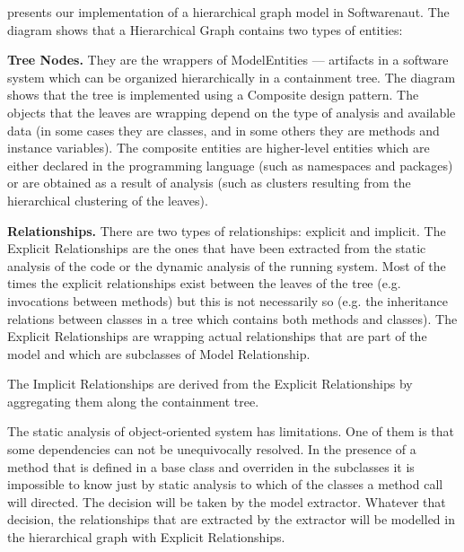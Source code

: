 \documentclass[preprint,12pt]{elsarticle}
\begin{document}
 presents our implementation of a hierarchical graph model in Softwarenaut.
The diagram shows that a Hierarchical Graph contains two types of entities: 

\begin{description}
\item {\bf Tree Nodes.} They are the wrappers of ModelEntities --- artifacts in a software system which can be organized hierarchically in a containment tree. The diagram shows that the tree is implemented using a Composite design pattern. The objects that the leaves are wrapping depend on the type of analysis and available data (in some cases they are classes, and in some others they are methods and instance variables). The composite entities are higher-level entities which are either declared in the programming language (such as namespaces and packages) or are obtained as a result of analysis (such as clusters resulting from the hierarchical clustering of the leaves).
\item {\bf Relationships.} There are two types of relationships: explicit and implicit. The Explicit Relationships are the ones that have been extracted from the static analysis of the code or the dynamic analysis of the running system. Most of the times the explicit relationships exist between the leaves of the tree (e.g. invocations between methods) but this is not necessarily so (e.g. the inheritance relations between classes in a tree which contains both methods and classes). The Explicit Relationships are wrapping actual relationships that are part of the model and which are subclasses of Model Relationship.

The Implicit Relationships are derived from the Explicit Relationships by aggregating them along the containment tree. %

\end{description}

The static analysis of object-oriented system has limitations. One of them is that some dependencies can not be unequivocally resolved. In the presence of a method that is defined in a base class and overriden in the subclasses it is impossible to know just by static analysis to which of the classes a method call will directed. The decision will be taken by the model extractor. Whatever that decision, the relationships that are extracted by the extractor will be modelled in the hierarchical graph with Explicit Relationships.
\end{document}
